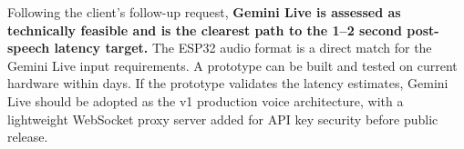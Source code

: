\documentclass[12pt,a4paper]{article}
\begin{document}
\medskip
Following the client's follow-up request, \textbf{Gemini Live is assessed as technically
feasible and is the clearest path to the 1--2 second post-speech latency target.} The ESP32
audio format is a direct match for the Gemini Live input requirements. A prototype can be
built and tested on current hardware within days. If the prototype validates the latency
estimates, Gemini Live should be adopted as the v1 production voice architecture, with a
lightweight WebSocket proxy server added for API key security before public release.
\end{document}
